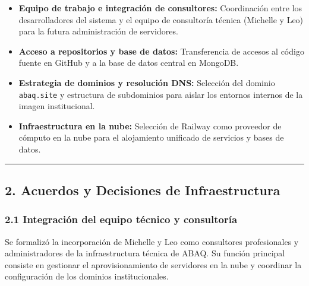 \documentclass[
]{article}
\providecommand{\tightlist}{%
  \setlength{\itemsep}{0pt}\setlength{\parskip}{0pt}}
\begin{document}
\begin{itemize}
\tightlist
\item
  \textbf{Equipo de trabajo e integración de consultores:} Coordinación
  entre los desarrolladores del sistema y el equipo de consultoría
  técnica (Michelle y Leo) para la futura administración de servidores.
\item
  \textbf{Acceso a repositorios y base de datos:} Transferencia de
  accesos al código fuente en GitHub y a la base de datos central en
  MongoDB.
\item
  \textbf{Estrategia de dominios y resolución DNS:} Selección del
  dominio \texttt{abaq.site} y estructura de subdominios para aislar los
  entornos internos de la imagen institucional.
\item
  \textbf{Infraestructura en la nube:} Selección de Railway como
  proveedor de cómputo en la nube para el alojamiento unificado de
  servicios y bases de datos.
\end{itemize}

\begin{center}\rule{0.5\linewidth}{0.5pt}\end{center}

\subsection{2. Acuerdos y Decisiones de
Infraestructura}\label{acuerdos-y-decisiones-de-infraestructura}

\subsubsection{2.1 Integración del equipo técnico y
consultoría}\label{integraciuxf3n-del-equipo-tuxe9cnico-y-consultoruxeda}

Se formalizó la incorporación de Michelle y Leo como consultores
profesionales y administradores de la infraestructura técnica de ABAQ.
Su función principal consiste en gestionar el aprovisionamiento de
servidores en la nube y coordinar la configuración de los dominios
institucionales.
\end{document}
